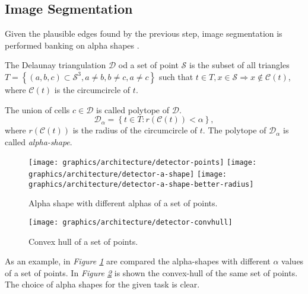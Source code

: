     \subsection{Image Segmentation}\label{subsection:segmentation}
        \par{
            Given the plausible edges found by the previous step, image segmentation is performed banking on alpha shapes \cite{springer:10.1007/11907350_46}.
        }
        \par{
            The Delaunay triangulation $\mathcal{D}$ od a set of point $\mathcal{S}$ is the subset of all triangles $T = \left\{\left(a, b, c\right) \subset \mathcal{S}^3, a \neq b, b \neq c, a \neq c \right\}$ such that $t \in T, x \in \mathcal{S} \Rightarrow x \not\in \mathcal{C}\left(t\right)$, where $\mathcal{C}\left(t\right)$ is the circumcircle of $t$.
        }
        \par{
            The union of cells $c \in \mathcal{D}$ is called polytope of $\mathcal{D}$. 
            \begin{equation*}
                \mathcal{D}_\alpha = \left\{t \in T \colon r\left(\mathcal{C}\left(t\right)\right) < \alpha\right\},
            \end{equation*}
            where $r\left(\mathcal{C}\left(t\right)\right)$ is the radius of the circumcircle of $t$. The polytope of $\mathcal{D}_\alpha$ is called \emph{alpha-shape}.
        }
        \begin{figure}
            \centering
            \texttt{[image: graphics/architecture/detector-points]}
            \texttt{[image: graphics/architecture/detector-a-shape]}
            \texttt{[image: graphics/architecture/detector-a-shape-better-radius]}
            \caption{Alpha shape with different alphas of a set of points.}\label{fig:example-alpha-shape}
        \end{figure}
        \begin{figure}
            \centering
            \texttt{[image: graphics/architecture/detector-convhull]}
            \caption{Convex hull of a set of points.}\label{fig:example-convex-hull}
        \end{figure}
        \par{
            As an example, in \emph{Figure \ref{fig:example-alpha-shape}} are compared the alpha-shapes with different $\alpha$ values of a set of points. In \emph{Figure \ref{fig:example-convex-hull}} is shown the convex-hull of the same set of points. The choice of alpha shapes for the given task is clear.
        }
